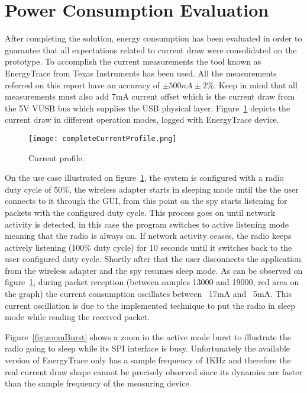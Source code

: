\documentclass[12pt]{article}
\begin{document}
\section{Power Consumption Evaluation}
\label{powerConsumptionEvaluation}
After completing the solution, energy consumption has been evaluated in order to guarantee that all expectations related to current draw were consolidated on the prototype. To accomplish the current measurements the tool known as EnergyTrace from Texas Instruments has been used. All the measurements referred on this report have an accuracy of $\pm 500nA \pm 2\%$. Keep in mind that all measurements must also add 7mA current offset which is the current draw from the 5V VUSB bus which supplies the USB physical layer. Figure~\ref{fig:completeCurrentProfile} depicts the current draw in different operation modes, logged with EnergyTrace device.

\begin{figure}[H]
    \centering
    \texttt{[image: completeCurrentProfile.png]}
    \caption{Current profile.}
    \label{fig:completeCurrentProfile}
\end{figure}

On the use case illustrated on figure~\ref{fig:completeCurrentProfile}, the system is configured with a radio duty cycle of 50\%, the wireless adapter starts in sleeping mode until the the user connects to it through the GUI, from this point on the spy starts listening for packets with the configured duty cycle. This process goes on until network activity is detected, in this case the program switches to active listening mode meaning that the radio is always on. If network activity ceases, the radio keeps actively listening (100\% duty cycle) for 10 seconds until it switches back to the user configured duty cycle. Shortly after that the user disconnects the application from the wireless adapter and the spy resumes sleep mode.
As can be observed on figure~\ref{fig:completeCurrentProfile}, during packet reception (between samples 13000 and 19000, red area on the graph) the current consumption oscillates between ~17mA and ~5mA. This current oscillation is due to the implemented technique to put the radio in sleep mode while reading the received packet. 

\newpage
Figure~\ref{fig:zoomBurst} shows a zoom in the active mode burst to illustrate the radio going to sleep while its SPI interface is busy. Unfortunately the available version of EnergyTrace only has a sample frequency of 1KHz and therefore the real current draw shape cannot be precisely observed since its dynamics are faster than the sample frequency of the measuring device.
\end{document}
